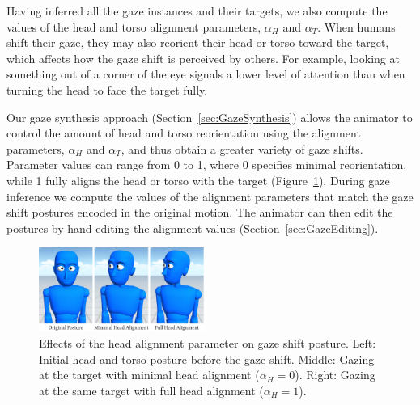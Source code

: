 Having inferred all the gaze instances and their targets, we also compute the values of the head and torso alignment parameters, $\alpha_{H}$ and $\alpha_{T}$. When humans shift their gaze, they may also reorient their head or torso toward the target, which affects how the gaze shift is perceived by others. For example, looking at something out of a corner of the eye signals a lower level of attention than when turning the head to face the target fully.

Our gaze synthesis approach (Section~\ref{sec:GazeSynthesis}) allows the animator to control the amount of head and torso reorientation using the alignment parameters, $\alpha_{H}$ and $\alpha_{T}$, and thus obtain a greater variety of gaze shifts. Parameter values can range from 0 to 1, where 0 specifies minimal reorientation, while 1 fully aligns the head or torso with the target (Figure~\ref{fig:GazeAlignments}). During gaze inference we compute the values of the alignment parameters that match the gaze shift postures encoded in the original motion. The animator can then edit the postures by hand-editing the alignment values (Section~\ref{sec:GazeEditing}).

\begin{figure}
\centering
\includegraphics[width=0.48\textwidth]{Figures/GazeAlignments.pdf}
\caption{Effects of the head alignment parameter on gaze shift posture. Left: Initial head and torso posture before the gaze shift. Middle: Gazing at the target with minimal head alignment ($\alpha_H = 0$). Right: Gazing at the same target with full head alignment ($\alpha_H = 1$).}
\label{fig:GazeAlignments}
\end{figure}

